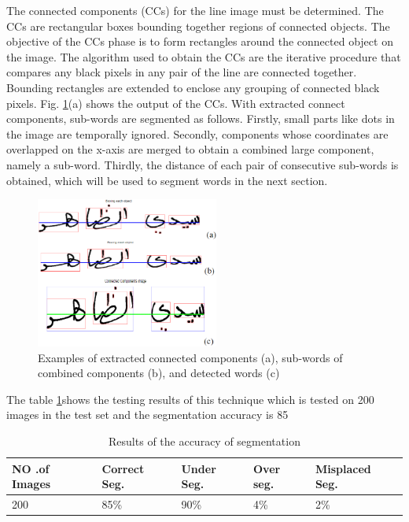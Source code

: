 \begin{itemize}[labelindent=1em,labelsep=0.25cm,leftmargin=*]
The connected components (CCs) for the line image must be determined.  The  CCs  are  rectangular  boxes  bounding  together  regions of connected objects. The objective of the CCs phase is to  form  rectangles  around  the  connected  object  on  the  image.    The algorithm used to obtain the CCs  are  the  iterative procedure that compares any black pixels in any pair of the line are connected together.    Bounding rectangles are  extended  to  enclose  any  grouping  of  connected  black  pixels.  Fig. \ref{fig:ccs}(a) shows the output of the CCs.  With extracted connect components,    sub-words are segmented  as  follows.  Firstly,  small  parts  like  dots  in  the  image  are  temporally  ignored.  Secondly,  components  whose  coordinates  are  overlapped  on  the x-axis  are  merged  to  obtain  a  combined  large  component,  namely  a sub-word.  Thirdly,  the  distance  of  each  pair  of  consecutive  sub-words  is  obtained,  which will be used to segment words in the next section.
\begin{figure}[!htb]
    \centering
    \includegraphics[width=6cm]{images/ccs.png}
    \caption{Examples of extracted connected components (a), sub-words of combined components (b), and detected words (c)}
    \label{fig:ccs}
\end{figure}

\end{itemize}

\noindent
The table \ref{tb:vpp-accuracy-table}shows the testing results of this technique which is tested on 200 images in the test set and the segmentation accuracy is  85%
    

\begin{table}[!htb]
\centering
\begin{tabular}{|l|l|l|l|l|}
\hline
 NO .of Images & Correct Seg. & Under Seg. & Over seg. & Misplaced Seg. \\ \hline
 200  & 85\%  & 90\% & 4\% & 2\% \\ \hline
\end{tabular}
\caption{Results of the accuracy of segmentation}
\label{tb:vpp-accuracy-table}
\end{table}

